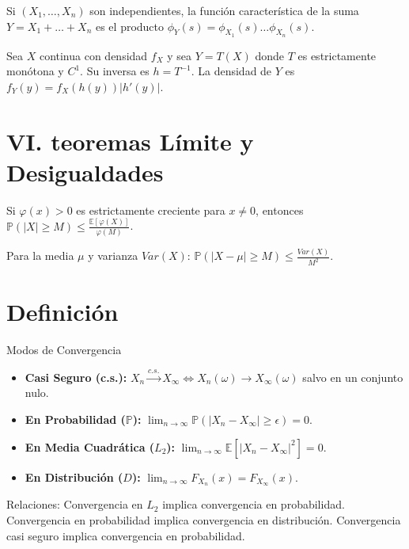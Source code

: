 \begin{teorema}
Si $(X_1, \dots, X_n)$ son independientes, la función característica de la suma $Y = X_1 + \dots + X_n$ es el producto $\phi_Y(s) = \phi_{X_1}(s) \dots \phi_{X_n}(s)$.
\end{teorema}

\begin{proposicion}
Sea $X$ continua con densidad $f_X$ y sea $Y = T(X)$ donde $T$ es estrictamente monótona y $C^1$. Su inversa es $h = T^{-1}$. La densidad de $Y$ es $f_Y(y) = f_X(h(y)) \left| h'(y) \right|$.
\end{proposicion}

\section*{VI. teoremas Límite y Desigualdades}

\begin{teorema}
Si $\varphi(x) > 0$ es estrictamente creciente para $x \neq 0$, entonces $\mathbb{P}(|X| \ge M) \le \frac{\mathbb{E}[\varphi(X)]}{\varphi(M)}$.
\end{teorema}

\begin{teorema}
Para la media $\mu$ y varianza $Var(X)$: $\mathbb{P}(|X - \mu| \ge M) \le \frac{Var(X)}{M^2}$.
\end{teorema}

\section*{Definición}{Modos de Convergencia} 
\begin{itemize}
    \item \textbf{Casi Seguro (c.s.):} $X_n \xrightarrow{c.s.} X_\infty \iff X_n(\omega) \to X_\infty(\omega)$ salvo en un conjunto nulo.
    \item \textbf{En Probabilidad ($\mathbb{P}$):} $\lim_{n\to\infty} \mathbb{P}(|X_n - X_\infty| \ge \epsilon) = 0$.
    \item \textbf{En Media Cuadrática ($L_2$):} $\lim_{n\to\infty} \mathbb{E}[|X_n - X_\infty|^2] = 0$.
    \item \textbf{En Distribución ($D$):} $\lim_{n\to\infty} F_{X_n}(x) = F_{X_\infty}(x)$.
\end{itemize}
Relaciones: Convergencia en $L_2$ implica convergencia en probabilidad. Convergencia en probabilidad implica convergencia en distribución. Convergencia casi seguro implica convergencia en probabilidad.

